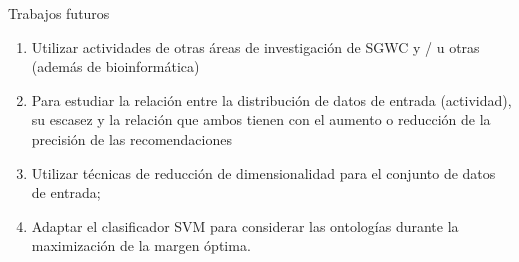  
 \begin{frame}
 	\begin{block}{Trabajos futuros}
 		\begin{enumerate}
 			\item Utilizar actividades de otras áreas de investigación de SGWC y / u otras (además de bioinformática)
 			\item Para estudiar la relación entre la distribución de datos de entrada (actividad), su escasez y la relación que ambos tienen con el aumento o reducción de la precisión de las recomendaciones
 			\item Utilizar técnicas de reducción de dimensionalidad para el conjunto de datos de entrada;
 			\item Adaptar el clasificador SVM para considerar las ontologías durante la maximización de la margen óptima.
 		\end{enumerate}		
 	\end{block}
 \end{frame}
